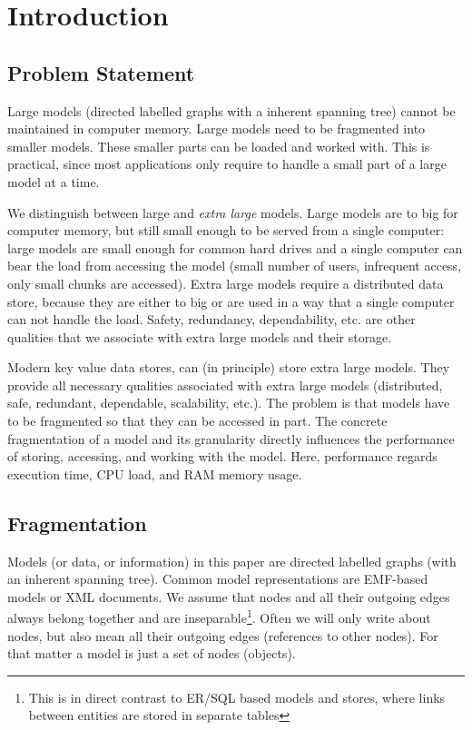 \section{Introduction}

\subsection{Problem Statement}
Large models (directed labelled graphs with a inherent spanning tree) cannot be maintained in computer memory. Large models need to be fragmented into smaller models. These smaller parts can be loaded and worked with. This is practical, since most applications only require to handle a small part of a large model at a time. 

We distinguish between large and \emph{extra large} models. Large models are to big for computer memory, but still small enough to be served from a single computer: large models are small enough for common hard drives and a single computer can bear the load from accessing the model (small number of users, infrequent access, only small chunks are accessed). Extra large models require a distributed data store, because they are either to big or are used in a way that a single computer can not handle the load. Safety, redundancy, dependability, etc. are other qualities that we associate with extra large models and their storage. 

Modern key value data stores, can (in principle) store extra large models. They provide all necessary qualities associated with extra large models (distributed, safe, redundant, dependable, scalability, etc.). The problem is that models have to be fragmented so that they can be accessed in part. The concrete fragmentation of a model and its granularity directly influences the performance of storing, accessing, and working with the model. Here, performance regards execution time, CPU load, and RAM memory usage. 

\subsection{Fragmentation}

Models (or data, or information) in this paper are directed labelled graphs (with an inherent spanning tree). Common model representations are EMF-based models or XML documents. We assume that nodes and all their outgoing edges always belong together and are inseparable\footnote{This is in direct contrast to ER/SQL based models and stores, where links between entities are stored in separate tables}. Often we will only write about nodes, but also mean all their outgoing edges (references to other nodes). For that matter a model is just a set of nodes (objects).

